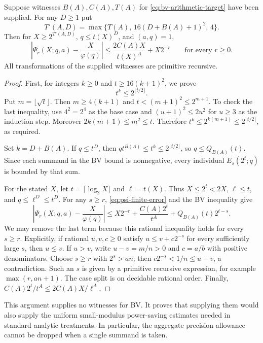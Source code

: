 \begin{proposition}
Suppose witnesses $B(A),C(A),T(A)$ for
\eqref{eq:bv-arithmetic-target} have been supplied. For any $D\geq1$ put
\[
 T'(A,D)=\max\{T(A),\,16(D+B(A)+1)^2,\,4\}.
\]
Then for $X\geq2^{T'(A,D)}$, $q\leq t(X)^D$, and $(a,q)=1$,
\[
 \left|\Psi_r(X;q,a)-\frac{X}{\varphi(q)}\right|
 \leq \frac{2C(A)X}{t(X)^A}+X2^{-r}
 \qquad\text{for every }r\geq0.
\]
All transformations of the supplied witnesses are primitive recursive.
\end{proposition}
\begin{proof}
First, for integers $k\geq0$ and $t\geq16(k+1)^2$, we prove
\begin{equation}
 t^k\leq2^{\lfloor t/2\rfloor}.
 \label{eq:integer-power-inclusion}
\end{equation}
Put $m=\lfloor\sqrt t\rfloor$. Then $m\geq4(k+1)$ and
$t<(m+1)^2\leq2^{m+1}$. To check the last inequality, use $4^2=2^4$
as the base case and $(u+1)^2\leq2u^2$ for $u\geq3$ as the induction
step. Moreover $2k(m+1)\leq m^2\leq t$. Therefore
$t^k\leq2^{k(m+1)}\leq2^{\lfloor t/2\rfloor}$, as required.

Set $k=D+B(A)$. If $q\leq t^D$, then
$qt^{B(A)}\leq t^k\leq2^{\lfloor t/2\rfloor}$, so
$q\leq Q_{B(A)}(t)$. Since each summand in the BV bound is nonnegative,
every individual $E_s(2^t;q)$ is bounded by that sum.

For the stated $X$, let $t=\lceil\log_2X\rceil$ and
$\ell=t(X)$. Thus $X\leq2^t<2X$, $\ell\leq t$, and
$q\leq\ell^D\leq t^D$. For any $s\geq r$,
\eqref{eq:psi-finite-error} and the BV inequality give
\[
 \left|\Psi_r(X;q,a)-\frac{X}{\varphi(q)}\right|
 \leq X2^{-r}+\frac{C(A)2^t}{t^A}
                 +Q_{B(A)}(t)2^{t-s}.
\]
We may remove the last term because this rational inequality holds for
every $s\geq r$. Explicitly, if rational $u,v,c\geq0$ satisfy
$u\leq v+c2^{-s}$ for every sufficiently large $s$, then $u\leq v$.
If $u>v$, write $u-v=m/n>0$ and $c=a/b$ with positive denominators.
Choose $s\geq r$ with $2^s>an$; then
$c2^{-s}<1/n\leq u-v$, a contradiction. Such an $s$ is given by a
primitive recursive expression, for example $\max(r,an+1)$.
The case split is on decidable rational order. Finally,
$C(A)2^t/t^A\leq2C(A)X/\ell^A$.
\end{proof}

This argument supplies no witnesses for BV. It proves that supplying
them would also supply the uniform small-modulus power-saving estimates
needed in standard analytic treatments. In particular, the aggregate
precision allowance cannot be dropped when a single summand is taken.

